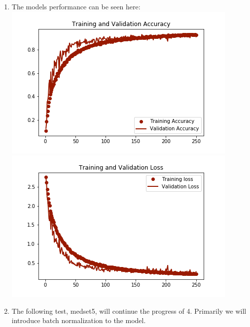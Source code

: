 \documentclass[12pt]{article} %
\begin{document}
\begin{enumerate}[label = (\roman*)]
\item The models performance can be seen here:
\newline\includegraphics{train-vs-val-acc-medset4}
\newline\includegraphics{train-vs-val-loss-medset4}
\item The following test, medset5, will continue the progress of 4. Primarily we will introduce batch normalization to the model.
\end{enumerate}
\end{document}
